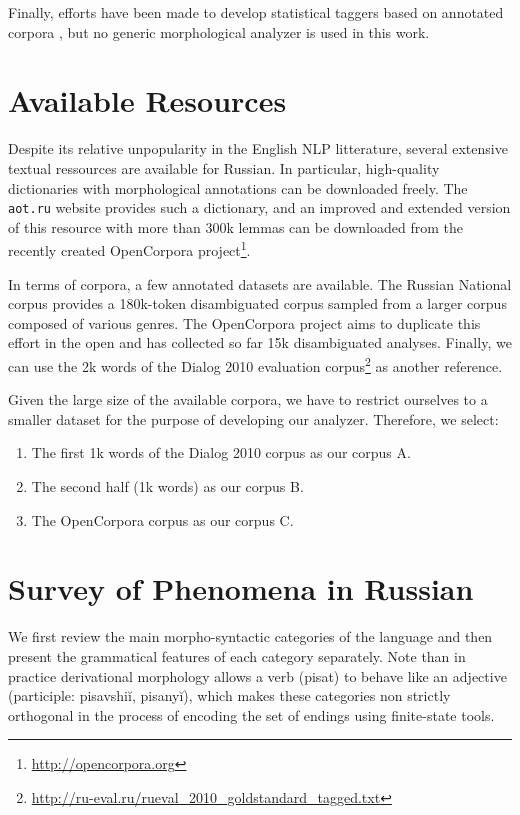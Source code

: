 \documentclass[11pt,letterpaper]{article}
\newcommand\textcyr[1]{{\fontencoding{OT2}\fontfamily{wncyr}\selectfont #1}}
\begin{document}
Finally, efforts have been made to develop statistical taggers based on annotated corpora \cite{sharoff2008}, but no generic morphological analyzer is used in this work.

\section{Available Resources}
Despite its relative unpopularity in the English NLP litterature, several extensive textual ressources are available for Russian. In particular, high-quality dictionaries with morphological annotations can be downloaded freely. The \texttt{aot.ru} website provides such a dictionary, and an improved and extended version of this resource with more than 300k lemmas can be downloaded from the recently created OpenCorpora project\footnote{\url{http://opencorpora.org}}.

In terms of corpora, a few annotated datasets are available. The Russian National corpus provides a 180k-token disambiguated corpus sampled from a larger corpus composed of various genres. The OpenCorpora project aims to duplicate this effort in the open and has collected so far 15k disambiguated analyses. Finally, we can use the 2k words of the Dialog 2010 evaluation corpus\footnote{\url{http://ru-eval.ru/rueval_2010_goldstandard_tagged.txt}} as another reference.

Given the large size of the available corpora, we have to restrict ourselves to a smaller dataset for the purpose of developing our analyzer. Therefore, we select:
\begin{enumerate}
    \item The first 1k words of the Dialog 2010 corpus as our corpus A.
    \item The second half (1k words) as our corpus B.
    \item The OpenCorpora corpus as our corpus C.
\end{enumerate}

\section{Survey of Phenomena in Russian}

We first review the main morpho-syntactic categories of the language and then present the grammatical features of each category separately. Note than in practice derivational morphology allows a verb (\textcyr{pisat\cyrsftsn}) to behave like an adjective (participle: \textcyr{pisavshi\u{i}, pisany\u{i}}), which makes these categories non strictly orthogonal in the process of encoding the set of endings using finite-state tools.
\end{document}
